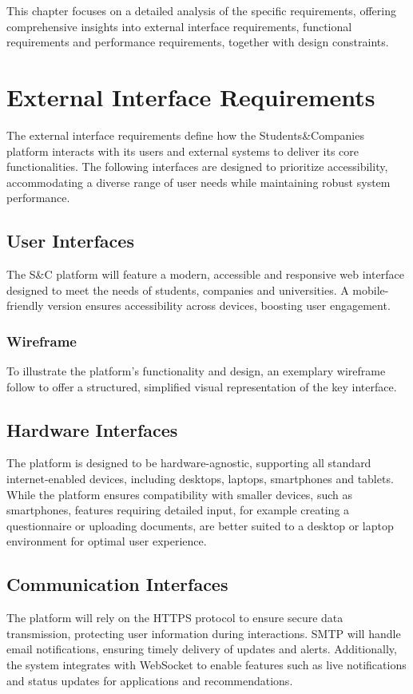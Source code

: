 This chapter focuses on a detailed analysis of the specific requirements, offering comprehensive insights into external interface requirements, functional requirements and performance requirements, together with design constraints.

\section{External Interface Requirements}
The external interface requirements define how the Students\&Companies platform interacts with its users and external systems to deliver its core functionalities.
The following interfaces are designed to prioritize accessibility, accommodating a diverse range of user needs while maintaining robust system performance.

\subsection{User Interfaces}
The S\&C platform will feature a modern, accessible and responsive web interface designed to meet the needs of students, companies and universities.
A mobile-friendly version ensures accessibility across devices, boosting user engagement.

\subsubsection{Wireframe}
To illustrate the platform’s functionality and design, an exemplary wireframe follow to offer a structured, simplified visual representation of the key interface.

\subsection{Hardware Interfaces}
The platform is designed to be hardware-agnostic, supporting all standard internet-enabled devices, including desktops, laptops, smartphones and tablets.
While the platform ensures compatibility with smaller devices, such as smartphones, features requiring detailed input, for example creating a questionnaire or uploading  documents, are better suited to a desktop or laptop environment for optimal user experience.

\subsection{Communication Interfaces}
The platform will rely on the HTTPS protocol to ensure secure data transmission, protecting user information during interactions.
SMTP will handle email notifications, ensuring timely delivery of updates and alerts.
Additionally, the system integrates with WebSocket to enable features such as live notifications and status updates for applications and recommendations.

